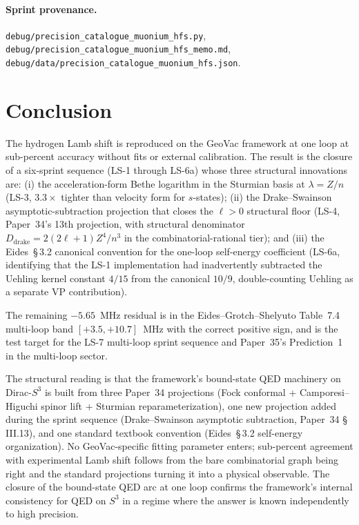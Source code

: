 \documentclass[11pt]{article}
\begin{document}
\paragraph{Sprint provenance.}
\texttt{debug/precision\_catalogue\_muonium\_hfs.py},
\texttt{debug/precision\_catalogue\_muonium\_hfs\_memo.md},
\texttt{debug/data/precision\_catalogue\_muonium\_hfs.json}.

\section{Conclusion}
\label{sec:conclusion}

The hydrogen Lamb shift is reproduced on the GeoVac framework at one
loop at sub-percent accuracy without fits or external calibration.
The result is the closure of a six-sprint sequence (LS-1 through
LS-6a) whose three structural innovations are:
(i) the acceleration-form Bethe logarithm in the Sturmian basis at
$\lambda = Z/n$ (LS-3, $3.3\times$ tighter than velocity form for
$s$-states); (ii) the Drake--Swainson asymptotic-subtraction
projection that closes the $\ell > 0$ structural floor (LS-4,
Paper~34's 13th projection, with structural denominator
$D_\text{drake} = 2(2\ell + 1)Z^4/n^3$ in the combinatorial-rational
tier); and (iii) the Eides~\S\,3.2 canonical convention for the
one-loop self-energy coefficient (LS-6a, identifying that the LS-1
implementation had inadvertently subtracted the Uehling kernel
constant $4/15$ from the canonical $10/9$, double-counting Uehling
as a separate VP contribution).

The remaining $-5.65$~MHz residual is in the
Eides--Grotch--Shelyuto Table~7.4 multi-loop band $[+3.5, +10.7]$~MHz
with the correct positive sign, and is the test target for the
LS-7 multi-loop sprint sequence and Paper~35's
Prediction~1 in the multi-loop sector.

The structural reading is that the framework's bound-state QED
machinery on Dirac-$S^3$ is built from three Paper~34 projections
(Fock conformal + Camporesi--Higuchi spinor lift + Sturmian
reparameterization), one new projection added during the sprint
sequence (Drake--Swainson asymptotic subtraction, Paper~34
\S\,III.13), and one standard textbook convention (Eides~\S\,3.2
self-energy organization).  No GeoVac-specific fitting parameter
enters; sub-percent agreement with experimental Lamb shift follows
from the bare combinatorial graph being right and the standard
projections turning it into a physical observable.  The closure of
the bound-state QED arc at one loop confirms the framework's internal
consistency for QED on $S^3$ in a regime where the answer is known
independently to high precision.
\end{document}

